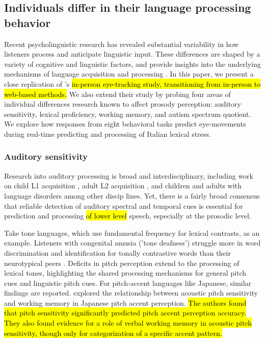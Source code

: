 \subsection{Individuals differ in their language processing behavior}

Recent psycholinguistic research has revealed substantial variability in how listeners process and anticipate linguistic input. These differences are shaped by a variety of cognitive and linguistic factors, and provide insights into the underlying mechanisms of language acquisition and processing \citep{Huettig2016, Kidd2018}. In this paper, we present a close replication of \cite{Sulpizio_McQueen_2012}'s \hl{in-person eye-tracking study, transitioning from in-person to web-based methods.} We also extend their study by probing four areas of individual differences research known to affect prosody perception: auditory sensitivity, lexical proficiency, working memory, and autism spectrum quotient. We explore how responses from eight behavioral tasks predict eye-movements during real-time predicting and processing of Italian lexical stress.

\subsubsection{Auditory sensitivity}
Research into auditory processing is broad and interdisciplinary, including work on child L1 acquisition \citep{benasich2002infant}, adult L2 acquisition \citep{lengeris2010effect, kempe2012individual}, and children and adults with language disorders \citep{goswami2013impaired} among other discip lines. Yet, there is a fairly broad consensus that reliable detection of auditory spectral and temporal cues is essential for prediction and processing \hl{of lower level} speech, especially at the prosodic level. 

Take tone languages, which use fundamental frequency for lexical contrasts, as an example. Listeners with congenital amusia ('tone deafness') struggle more in word discrimination and identification for tonally contrastive words than their neurotypical peers \citep{nan_2010, zhu2023tone}. Deficits in pitch perception extend to the processing of lexical tones, highlighting the shared processing mechanisms for general pitch cues and linguistic pitch cues. For pitch-accent languages like Japanese, similar findings are reported. \cite{goss_2014} explored the relationship between acoustic pitch sensitivity and working memory in Japanese pitch accent perception. \hl{The authors found that pitch sensitivity significantly predicted pitch accent perception accuracy. They also found evidence for a role of verbal working memory in acoustic pitch sensitivity, though only for categorization of a specific accent pattern.}

